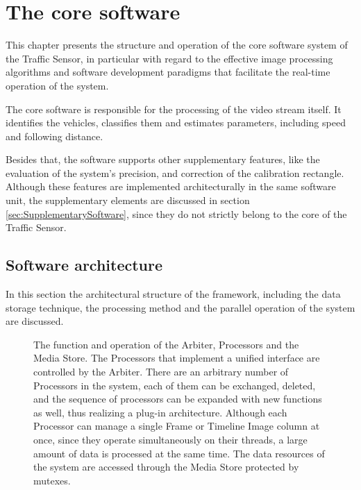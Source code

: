 \chapter{The core software}\label{chap:Core software}
This chapter presents the structure and operation of the core software system of the Traffic Sensor, in particular with regard to the effective image processing algorithms and software development paradigms that facilitate the real-time operation of the system.

The core software is responsible for the processing of the video stream itself.
It identifies the vehicles, classifies them and estimates parameters, including speed and following distance.
 
Besides that, the software supports other supplementary features, like the evaluation of the system's precision, and correction of the calibration rectangle.
Although these features are implemented architecturally in the same software unit, the supplementary elements are discussed in section \ref{sec:SupplementarySoftware}, since they do not strictly belong to the core of the Traffic Sensor.
\section{Software architecture}\label{sec:software_architecture}
In this section the architectural structure of the framework, including the data storage technique, the processing method and the parallel operation of the system are discussed.

\begin{figure}[!h]
	\centering
	
	\caption[The structure of the core software architecture]{The function and operation of the Arbiter, Processors and the Media Store. The Processors that implement a unified interface are controlled by the Arbiter. There are an arbitrary number of Processors in the system, each of them can be exchanged, deleted, and the sequence of processors can be expanded with new functions as well, thus realizing a plug-in architecture. Although each Processor can manage a single Frame or Timeline Image column at once, since they operate simultaneously on their threads, a large amount of data is processed at the same time. The data resources of the system are accessed through the Media Store protected by mutexes.\label{fig:arbiter_pipeline}}
\end{figure}

